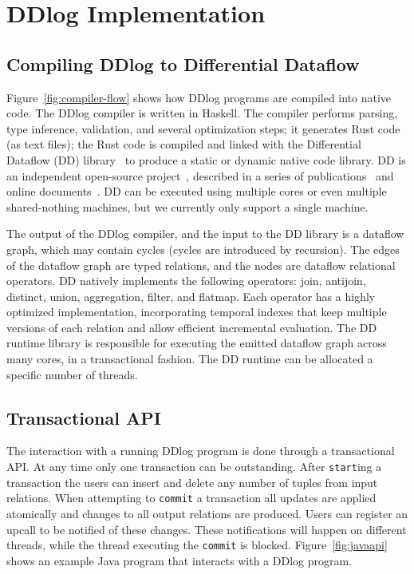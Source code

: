\section{DDlog Implementation}\label{sec-system}

\subsection{Compiling DDlog to Differential Dataflow}

Figure~\ref{fig:compiler-flow} shows how DDlog programs are compiled
into native code.  The DDlog compiler is written in Haskell.  The
compiler performs parsing, type inference, validation, and several
optimization steps; it generates Rust code (as text files); the Rust
code is compiled and linked with the Differential Dataflow (DD)
library~\cite{differential-dataflow} to produce a static or dynamic
native code library.  DD is an independent open-source
project~\cite{differential-dataflow}, described in a series of
publications~\cite{timely-dataflow,differential-dataflow-paper} and
online documents~\cite{dd-mdbook,dd-reference}.  DD can be executed
using multiple cores or even multiple shared-nothing machines, but we
currently only support a single machine.

The output of the DDlog compiler, and the input to the DD library is a
dataflow graph, which may contain cycles (cycles are introduced by
recursion).  The edges of the dataflow graph are typed relations, and
the nodes are dataflow relational operators.  DD natively implements
the following operators: join, antijoin, distinct, union, aggregation,
filter, and flatmap.  Each operator has a highly optimized
implementation, incorporating temporal indexes that keep multiple
versions of each relation and allow efficient incremental evaluation.
The DD runtime library is responsible for executing the emitted
dataflow graph across many cores, in a transactional fashion.  The
DD runtime can be allocated a specific number of threads.

\subsection{Transactional API}

The interaction with a running DDlog program is done through a
transactional API.  At any time only one transaction can be
outstanding.  After \texttt{start}ing a transaction the users can
insert and delete any number of tuples from input relations.  When
attempting to \texttt{commit} a transaction all updates are applied
atomically and changes to all output relations are produced.  Users
can register an upcall to be notified of these changes.  These
notifications will happen on different threads, while the thread
executing the \texttt{commit} is blocked.  Figure~\ref{fig:javaapi}
shows an example Java program that interacts with a DDlog program.


